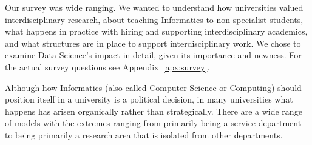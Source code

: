 \documentclass[11pt]{amsart}
\begin{document}
Our survey was wide ranging. We wanted to understand how universities valued interdisciplinary research, about teaching Informatics to non-specialist students, what happens in practice with hiring and supporting interdisciplinary academics, and what structures are in place to support interdisciplinary work. We chose to examine Data Science's impact in detail, given its importance and newness. For the actual survey questions see Appendix~\ref{apx:survey}. 

Although how Informatics (also called Computer Science or Computing) should position itself in a university is a political decision, in many universities what happens has arisen organically rather than strategically. There are a wide range of models with the extremes ranging from primarily being a service department to being primarily a research area that is isolated from other departments.








\end{document}
